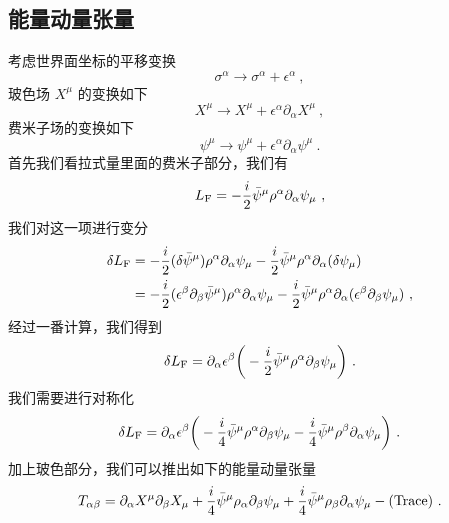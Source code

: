 \subsection{能量动量张量}
考虑世界面坐标的平移变换
\begin{equation}
\sigma^\alpha \rightarrow \sigma^\alpha + \epsilon^\alpha~,
\end{equation}
玻色场 $X^\mu$ 的变换如下
\begin{equation}
X^\mu \rightarrow X^\mu + \epsilon^\alpha \partial_\alpha X^\mu ~,
\end{equation}
费米子场的变换如下
\begin{equation}
\psi^\mu \rightarrow \psi^\mu + \epsilon^\alpha \partial_\alpha \psi^\mu ~.
\end{equation}
首先我们看拉式量里面的费米子部分，我们有
\begin{equation}
L_{\rm F} = - \frac{i}{2} \bar\psi^\mu \rho^\alpha \partial_\alpha \psi_\mu ~,
\end{equation}
我们对这一项进行变分
\begin{equation}
\begin{aligned}
\delta L_{\rm F} & = - \frac{i}{2} (\delta \bar\psi^\mu) \rho^\alpha \partial_\alpha \psi_\mu - \frac{i}{2} \bar\psi^\mu \rho^\alpha \partial_\alpha (\delta \psi_\mu) \\
& = -\frac{i}{2} (\epsilon^\beta\partial_\beta\bar\psi^\mu) \rho^\alpha \partial_\alpha \psi_\mu - \frac{i}{2} \bar\psi^\mu \rho^\alpha \partial_\alpha (\epsilon^\beta\partial_\beta \psi_\mu) ~,
\end{aligned}
\end{equation}
经过一番计算，我们得到
\begin{equation}
\delta L_{\rm F} = \partial_\alpha \epsilon^\beta \bigg( - \frac{i}{2} \bar\psi^\mu \rho^\alpha \partial_\beta \psi_\mu \bigg)~.
\end{equation}
我们需要进行对称化
\begin{equation}
\delta L_{\rm F} = \partial_\alpha \epsilon^\beta \bigg(    -\frac{i}{4} \bar\psi^\mu \rho^\alpha \partial_\beta \psi_\mu - \frac{i}{4} \bar \psi^\mu \rho^\beta\partial_\alpha \psi_\mu  \bigg)~.
\end{equation}
加上玻色部分，我们可以推出如下的能量动量张量
\begin{equation}
T_{\alpha\beta} = \partial_\alpha X^\mu \partial_\beta X_\mu + \frac{i}{4} \bar\psi^\mu \rho_\alpha \partial_\beta \psi_\mu + \frac{i}{4} \bar \psi^\mu \rho_\beta\partial_\alpha\psi_\mu - {\rm (Trace)}~.
\end{equation}
